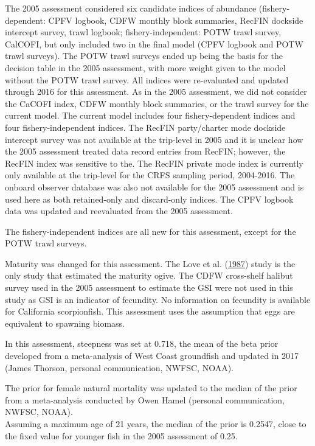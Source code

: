 \documentclass[12pt,]{article}
\begin{document}
The 2005 assessment considered six candidate indices of abundance
(fishery-dependent: CPFV logbook, CDFW monthly block summaries, RecFIN
dockside intercept survey, trawl logbook; fishery-independent: POTW
trawl survey, CalCOFI, but only included two in the final model (CPFV
logbook and POTW trawl surveys). The POTW trawl surveys ended up being
the basis for the decision table in the 2005 assessment, with more
weight given to the model without the POTW trawl survey. All indices
were re-evaluated and updated through 2016 for this assessment. As in
the 2005 assessment, we did not consider the CaCOFI index, CDFW monthly
block summaries, or the trawl survey for the current model. The current
model includes four fishery-dependent indices and four
fishery-independent indices. The RecFIN party/charter mode dockside
intercept survey was not available at the trip-level in 2005 and it is
unclear how the 2005 assessment treated data record entries from RecFIN;
however, the RecFIN index was sensitive to the. The RecFIN private mode
index is currently only available at the trip-level for the CRFS
sampling period, 2004-2016. The onboard observer database was also not
available for the 2005 assessment and is used here as both retained-only
and discard-only indices. The CPFV logbook data was updated and
reevaluated from the 2005 assessment.

The fishery-independent indices are all new for this assessment, except
for the POTW trawl surveys.

Maturity was changed for this assessment. The Love et al.
(\protect\hyperlink{ref-Love1987}{1987}) study is the only study that
estimated the maturity ogive. The CDFW cross-shelf halibut survey used
in the 2005 assessment to estimate the GSI were not used in this study
as GSI is an indicator of fecundity. No information on fecundity is
available for California scorpionfish. This assessment uses the
assumption that eggs are equivalent to spawning biomass.

In this assessment, steepness was set at 0.718, the mean of the beta
prior developed from a meta-analysis of West Coast groundfish and
updated in 2017 (James Thorson, personal communication, NWFSC, NOAA).

The prior for female natural mortality was updated to the median of the
prior from a meta-analysis conducted by Owen Hamel (personal
communication, NWFSC, NOAA).\\
Assuming a maximum age of 21 years, the median of the prior is 0.2547,
close to the fixed value for younger fish in the 2005 assessment of
0.25.
\end{document}
